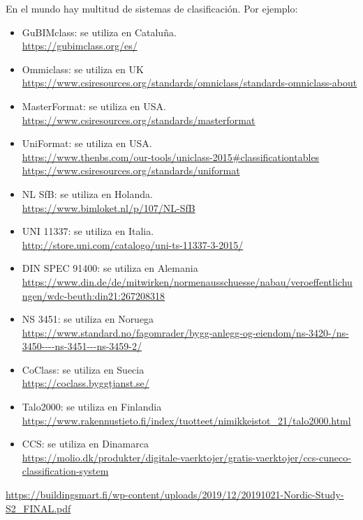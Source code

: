 \documentclass[spanish,10pt,a4paper,final,oneside]{article}
\begin{document}
En el mundo hay multitud de sistemas de clasificación. Por ejemplo:
\begin{itemize}

\item GuBIMclass: se utiliza en Cataluña.
\\ \url{https://gubimclass.org/es/}

\item Ommiclass: se utiliza en UK
\\ \url{https://www.csiresources.org/standards/omniclass/standards-omniclass-about}

\item MasterFormat: se utiliza en USA.
\\ \url{https://www.csiresources.org/standards/masterformat}

\item UniFormat: se utiliza en USA.
\\ \url{https://www.thenbs.com/our-tools/uniclass-2015#classificationtables}
\\ \url{https://www.csiresources.org/standards/uniformat}

\item NL SfB:  se utiliza en Holanda.
\\ \url{https://www.bimloket.nl/p/107/NL-SfB}

\item UNI 11337: se utiliza en Italia.
\\ \url{http://store.uni.com/catalogo/uni-ts-11337-3-2015/}

\item DIN SPEC 91400: se utiliza en Alemania 
\\ \url{https://www.din.de/de/mitwirken/normenausschuesse/nabau/veroeffentlichungen/wdc-beuth:din21:267208318}

\item NS 3451: se utiliza en Noruega
\\ \url{https://www.standard.no/fagomrader/bygg-anlegg-og-eiendom/ns-3420-/ns-3450----ns-3451---ns-3459-2/}

\item CoClass: se utiliza en Suecia
\\ \url{https://coclass.byggtjanst.se/}

\item Talo2000: se utiliza en Finlandia
\\ \url{https://www.rakennustieto.fi/index/tuotteet/nimikkeistot_21/talo2000.html}

\item CCS: se utiliza en Dinamarca
\\ \url{https://molio.dk/produkter/digitale-vaerktojer/gratis-vaerktojer/ccs-cuneco-classification-system}

\end{itemize}
\url{https://buildingsmart.fi/wp-content/uploads/2019/12/20191021-Nordic-Study-S2_FINAL.pdf}
\end{document}
